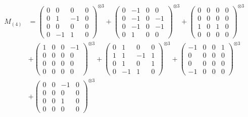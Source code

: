 \documentclass{article}
\newcommand{\Mthree}{%
    M_{(4)}
}
\begin{document}
        \newpage
        
        \footnotesize{
        \begin{align}
        \Mthree
        &= \label{Rs16-Rc11-Solution-9-c1} \begin{pmatrix} 0 & 0 & 0 & 0 \\ 0 & 1 & -1 & 0 \\ 0 & 0 & 0 & 0 \\ 0 & -1 & 1 & 0 \end{pmatrix}^{\otimes 3} 
            + \begin{pmatrix} 0 & -1 & 0 & 0 \\ 0 & -1 & 0 & -1 \\ 0 & -1 & 0 & -1 \\ 0 & 1 & 0 & 0 \end{pmatrix}^{\otimes 3} 
            + \begin{pmatrix} 0 & 0 & 0 & 0 \\ 0 & 0 & 0 & 0 \\ 1 & 0 & 1 & 0 \\ 0 & 0 & 0 & 0 \end{pmatrix}^{\otimes 3} \\
        &+ \label{Rs16-Rc11-Solution-9-c4} \begin{pmatrix} 1 & 0 & 0 & -1 \\ 0 & 0 & 0 & 0 \\ 0 & 0 & 0 & 0 \\ 0 & 0 & 0 & 0 \end{pmatrix}^{\otimes 3} 
            + \begin{pmatrix} 0 & 1 & 0 & 0 \\ 1 & 1 & -1 & 1 \\ 0 & 1 & 0 & 1 \\ 0 & -1 & 1 & 0 \end{pmatrix}^{\otimes 3} 
            + \begin{pmatrix} -1 & 0 & 0 & 1 \\ 0 & 0 & 0 & 0 \\ 0 & 0 & 0 & 0 \\ -1 & 0 & 0 & 0 \end{pmatrix}^{\otimes 3} \\
        &+ \label{Rs16-Rc11-Solution-9-c7} \begin{pmatrix} 0 & 0 & -1 & 0 \\ 0 & 0 & 0 & 0 \\ 0 & 0 & 1 & 0 \\ 0 & 0 & 0 & 0 \end{pmatrix}^{\otimes 3} 

\end{align}}
\end{document}
